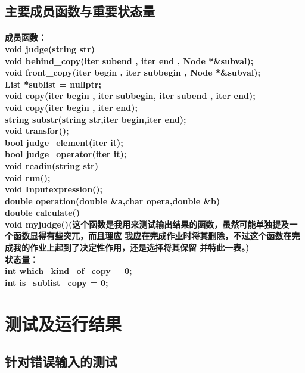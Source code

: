 \documentclass[UTF8]{ctexart}
\begin{document}
\subsection{主要成员函数与重要状态量}
\paragraph{
    \hspace{2em}成员函数：\\
void judge(string str)\\
void behind\_copy(iter subend , iter end , Node *\&subval);\\
void front\_copy(iter begin , iter subbegin , Node *\&subval);\\
List *sublist = nullptr;\\
void copy(iter begin , iter subbegin, iter subend , iter end);\\
void copy(iter begin , iter end);\\
string substr(string str,iter begin,iter end);\\
void transfor();\\
bool judge\_element(iter it);\\
bool judge\_operator(iter it);\\
void readin(string str) \\
void run();\\
void Inputexpression();\\
double operation(double \&a,char opera,double \&b)\\
double calculate()\\
void myjudge()(这个函数是我用来测试输出结果的函数，虽然可能单独提及一个函数显得有些突兀，而且理应
我应在完成作业时将其删除，不过这个函数在完成我的作业上起到了决定性作用，还是选择将其保留
并特此一表。)\\
\hspace{2em}状态量：\\
int which\_kind\_of\_copy = 0;\\
int is\_sublist\_copy = 0;\\
}
\section{测试及运行结果}
\subsection{针对错误输入的测试}
\end{document}
